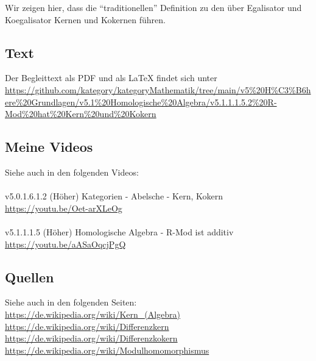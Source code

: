 \documentclass[a4paper]{amsart}
\theoremstyle{definition}
\begin{document}
Wir zeigen hier, dass die "`traditionellen"' Definition zu den über Egalisator und Koegalisator Kernen und Kokernen führen.

\subsection*{Text}
Der Begleittext als PDF und als LaTeX findet sich unter
{\tiny
   \url{https://github.com/kategory/kategoryMathematik/tree/main/v5%20H%C3%B6here%20Grundlagen/v5.1%20Homologische%20Algebra/v5.1.1.1.5.2%20R-Mod%20hat%20Kern%20und%20Kokern}
}

\subsection*{Meine Videos}
Siehe auch in den folgenden Videos:\\
\\
v5.0.1.6.1.2 (Höher) Kategorien - Abelsche - Kern, Kokern\\
\url{https://youtu.be/Oet-arXLeOg}\\
\\
v5.1.1.1.5 (Höher) Homologische Algebra - R-Mod ist additiv\\
\url{https://youtu.be/aASaOqcjPgQ}\\

\subsection*{Quellen}
Siehe auch in den folgenden Seiten:\\
\url{https://de.wikipedia.org/wiki/Kern_(Algebra)}\\
\url{https://de.wikipedia.org/wiki/Differenzkern}\\
\url{https://de.wikipedia.org/wiki/Differenzkokern}\\
\url{https://de.wikipedia.org/wiki/Modulhomomorphismus}
\end{document}
